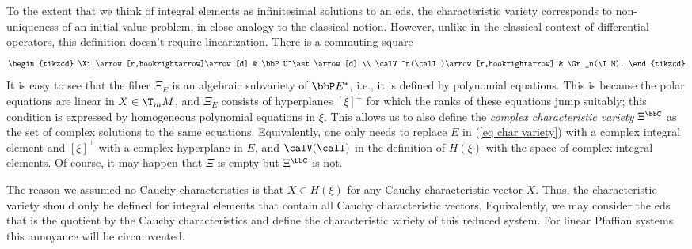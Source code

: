 To the extent that we think of integral elements as infinitesimal solutions to an \gls{eds}, the characteristic variety corresponds to non-uniqueness of an initial value problem, in close analogy to the classical notion. However, unlike in the classical context of differential operators, this definition doesn't require linearization. There is a commuting square 
\[\begin{tikzcd}
    \Xi\arrow[r,hookrightarrow]\arrow[d] & \bbP U^\ast\arrow[d] \\
    \calV^n(\calI)\arrow[r,hookrightarrow] & \Gr_n(\T M).
\end{tikzcd}\]
It is easy to see that the fiber $\Xi_E$ is an algebraic subvariety of $\bbP E^\ast$, i.e., it is defined by polynomial equations. This is because the polar equations are linear in $X\in \T_m M$, and $\Xi_E$ consists of hyperplanes $[\xi]^\perp$ for which the ranks of these equations jump suitably; this condition is expressed by homogeneous polynomial equations in $\xi$. This allows us to also define the \emph{complex characteristic variety} $\Xi^\bbC$ as the set of complex solutions to the same equations. Equivalently, one only needs to replace $E$ in (\ref{eq char variety}) with a complex integral element and $[\xi]^\perp$ with a complex hyperplane in $E$, and $\calV(\calI)$ in the definition of $H(\xi)$ with the space of complex integral elements. Of course, it may happen that $\Xi$ is empty but $\Xi^\bbC$ is not.

The reason we assumed no Cauchy characteristics is that $X\in H(\xi)$ for any Cauchy characteristic vector $X$. Thus, the characteristic variety should only be defined for integral elements that contain all Cauchy characteristic vectors. Equivalently, we may consider the \gls{eds} that is the quotient by the Cauchy characteristics and define the characteristic variety of this reduced system. For linear Pfaffian systems this annoyance will be circumvented.

